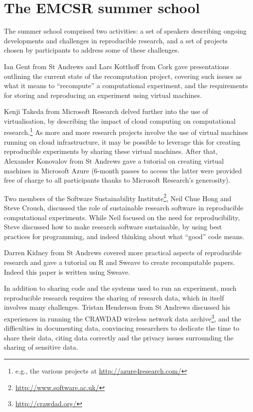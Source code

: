 \section{The EMCSR summer school}
\label{s:school}

The summer school comprised two activities: a set of speakers
describing ongoing developments and challenges in reproducible
research, and a set of projects chosen by participants to address some
of these challenges.

Ian Gent from St Andrews and Lars Kotthoff from Cork gave
presentations outlining the current state of the recomputation
project, covering such issues as what it means to ``recompute'' a
computational experiment, and the requirements for storing and
reproducing an experiment using virtual machines.

Kenji Takeda from Microsoft Research delved further into the use of
virtualisation, by describing the impact of cloud computing on
computational research.\footnote{e.g., the various projects at
\url{http://azure4research.com/}} As more and more research projects
involve the use of virtual machines running on cloud infrastructure,
it may be possible to leverage this for creating
reproducible experiments by sharing these virtual machines. After that,
Alexander Konovalov from St Andrews gave a tutorial on creating
virtual machines in Microsoft Azure (6-month passes to access the
latter were provided free of charge to all participants thanks to Microsoft Research's
generosity).

Two members of the Software Sustainability
Institute\footnote{\url{http://www.software.ac.uk/}}, Neil Chue Hong
and Steve Crouch, discussed the role of sustainable research software
in reproducible computational experiments. While Neil focused on the
need for reproducibility, Steve discussed how to make research
software sustainable, by using best practices for programming, and
indeed thinking about what ``good'' code means.

Darren Kidney from St Andrews covered more practical aspects of reproducible
research and gave a tutorial on R and Sweave to create
recomputable papers. Indeed this paper is written using Sweave.

In addition to sharing code and the systems used to run an experiment,
much reproducible research requires the sharing of research data,
which in itself involves many challenges. Tristan Henderson from St
Andrews discussed his experiences in running the CRAWDAD wireless
network data archive\footnote{\url{http://crawdad.org/}}, and the
difficulties in documenting data, convincing researchers to dedicate
the time to share their data, citing data correctly and the privacy
issues surrounding the sharing of sensitive data.

